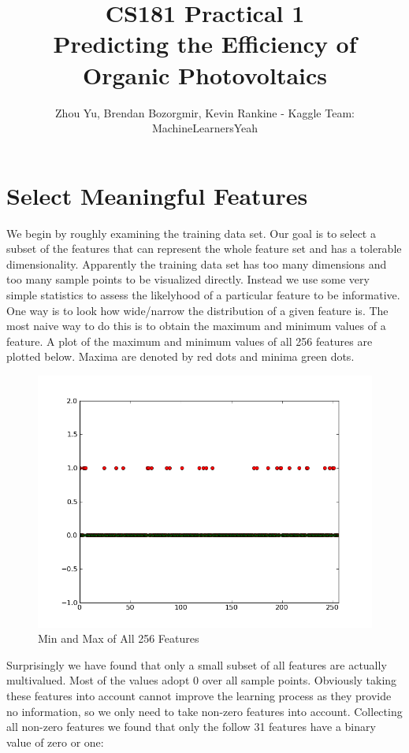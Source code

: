 \documentclass[11pt]{article}
\title{CS181 Practical 1 \\ Predicting the Efficiency of Organic Photovoltaics}
\author{Zhou Yu, Brendan Bozorgmir, Kevin Rankine - Kaggle Team: MachineLearnersYeah}
\begin{document}
\maketitle
\newpage
\tableofcontents
\newpage
\section{Select Meaningful Features}
We begin by roughly examining the training data set. Our goal is to select a subset of the features that can represent the whole feature set and has a tolerable dimensionality. Apparently the training data set has too many dimensions and too many sample points to be visualized directly. Instead we use some very simple statistics to assess the likelyhood of a particular feature to be informative. One way is to look how wide/narrow the distribution of a given feature is. The most naive way to do this is to obtain the maximum and minimum values of a feature. A plot of the maximum and minimum values of all 256 features are plotted below. Maxima are denoted by red dots and minima green dots. 
\begin{figure}[h!]
\centering
\includegraphics[scale=0.5]{examining_min_and_max.png}
\caption{Min and Max of All 256 Features}
\end{figure}
Surprisingly we have found that only a small subset of all features are actually multivalued. Most of the values adopt 0 over all sample points. Obviously taking these features into account cannot improve the learning process as they provide no information, so we only need to take non-zero features into account. Collecting all non-zero features we found that only the follow 31 features have a binary value of zero or one:
\end{document}
